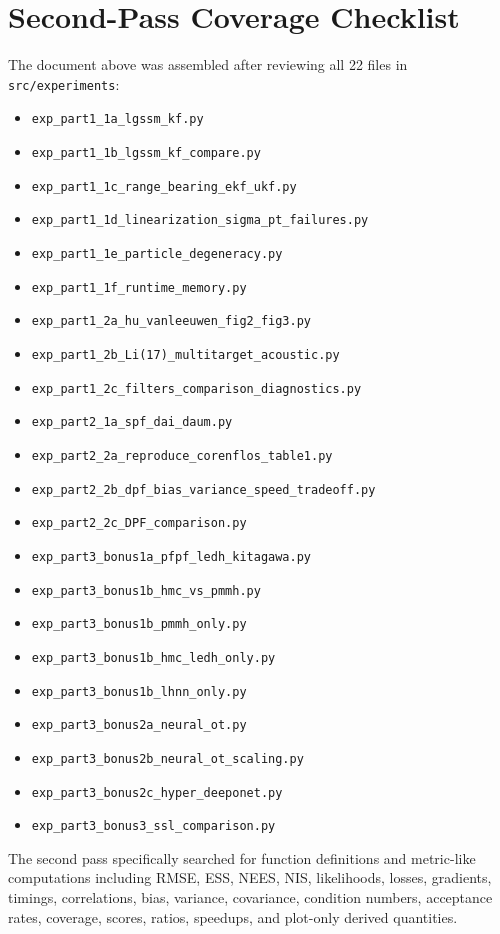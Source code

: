 \documentclass[11pt]{article}
\newcommand{\code}[1]{\texttt{#1}}
\begin{document}
\section{Second-Pass Coverage Checklist}
The document above was assembled after reviewing all 22 files in \code{src/experiments}:
\begin{itemize}
\item \code{exp\_part1\_1a\_lgssm\_kf.py}
\item \code{exp\_part1\_1b\_lgssm\_kf\_compare.py}
\item \code{exp\_part1\_1c\_range\_bearing\_ekf\_ukf.py}
\item \code{exp\_part1\_1d\_linearization\_sigma\_pt\_failures.py}
\item \code{exp\_part1\_1e\_particle\_degeneracy.py}
\item \code{exp\_part1\_1f\_runtime\_memory.py}
\item \code{exp\_part1\_2a\_hu\_vanleeuwen\_fig2\_fig3.py}
\item \code{exp\_part1\_2b\_Li(17)\_multitarget\_acoustic.py}
\item \code{exp\_part1\_2c\_filters\_comparison\_diagnostics.py}
\item \code{exp\_part2\_1a\_spf\_dai\_daum.py}
\item \code{exp\_part2\_2a\_reproduce\_corenflos\_table1.py}
\item \code{exp\_part2\_2b\_dpf\_bias\_variance\_speed\_tradeoff.py}
\item \code{exp\_part2\_2c\_DPF\_comparison.py}
\item \code{exp\_part3\_bonus1a\_pfpf\_ledh\_kitagawa.py}
\item \code{exp\_part3\_bonus1b\_hmc\_vs\_pmmh.py}
\item \code{exp\_part3\_bonus1b\_pmmh\_only.py}
\item \code{exp\_part3\_bonus1b\_hmc\_ledh\_only.py}
\item \code{exp\_part3\_bonus1b\_lhnn\_only.py}
\item \code{exp\_part3\_bonus2a\_neural\_ot.py}
\item \code{exp\_part3\_bonus2b\_neural\_ot\_scaling.py}
\item \code{exp\_part3\_bonus2c\_hyper\_deeponet.py}
\item \code{exp\_part3\_bonus3\_ssl\_comparison.py}
\end{itemize}
The second pass specifically searched for function definitions and metric-like computations including RMSE, ESS, NEES, NIS, likelihoods, losses, gradients, timings, correlations, bias, variance, covariance, condition numbers, acceptance rates, coverage, scores, ratios, speedups, and plot-only derived quantities.
\end{document}
